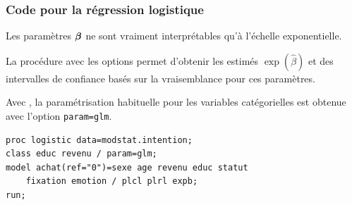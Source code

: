 \documentclass{beamer}
\begin{document}
\begin{frame}[fragile]
\frametitle{Code \SASlang pour la régression logistique}
\bi
\item Les paramètres $\boldsymbol {\beta}$ ne sont vraiment interprétables qu'à l'échelle exponentielle.
\item La procédure  avec les options  permet d'obtenir les estimés $\exp(\hat{\beta})$ et des intervalles de confiance basés sur la vraisemblance pour ces paramètres.
\item Avec , la paramétrisation habituelle pour les variables catégorielles est obtenue avec l'option \texttt{param=glm}.
\ei
\begin{tcolorbox}[colback=white, colframe=hecblue, title=Code \SASlang{} pour \code{proc logistic}]
\begin{verbatim}
proc logistic data=modstat.intention;
class educ revenu / param=glm;
model achat(ref="0")=sexe age revenu educ statut
    fixation emotion / plcl plrl expb;
run;
\end{verbatim}
\end{tcolorbox}
\end{frame}
\end{document}
